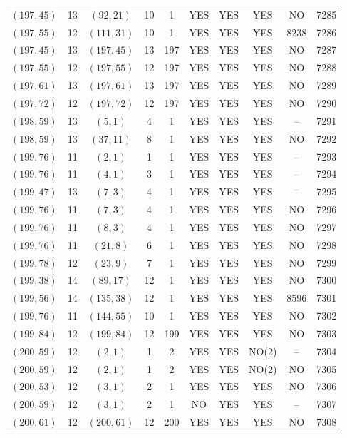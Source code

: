 \begin{longtable}{|c|c|c|c|c|c|c|c|c|c|}
$(197, 45)$ & 13 & $(92, 21)$ & 10 & 1 & YES & YES & YES & NO & 7285\\
$(197, 55)$ & 12 & $(111, 31)$ & 10 & 1 & YES & YES & YES & 8238 & 7286\\
$(197, 45)$ & 13 & $(197, 45)$ & 13 & 197 & YES & YES & YES & NO & 7287\\
$(197, 55)$ & 12 & $(197, 55)$ & 12 & 197 & YES & YES & YES & NO & 7288\\
$(197, 61)$ & 13 & $(197, 61)$ & 13 & 197 & YES & YES & YES & NO & 7289\\
$(197, 72)$ & 12 & $(197, 72)$ & 12 & 197 & YES & YES & YES & NO & 7290\\
$(198, 59)$ & 13 & $(5, 1)$ & 4 & 1 & YES & YES & YES & -- & 7291\\
$(198, 59)$ & 13 & $(37, 11)$ & 8 & 1 & YES & YES & YES & NO & 7292\\
$(199, 76)$ & 11 & $(2, 1)$ & 1 & 1 & YES & YES & YES & -- & 7293\\
$(199, 76)$ & 11 & $(4, 1)$ & 3 & 1 & YES & YES & YES & -- & 7294\\
$(199, 47)$ & 13 & $(7, 3)$ & 4 & 1 & YES & YES & YES & -- & 7295\\
$(199, 76)$ & 11 & $(7, 3)$ & 4 & 1 & YES & YES & YES & NO & 7296\\
$(199, 76)$ & 11 & $(8, 3)$ & 4 & 1 & YES & YES & YES & NO & 7297\\
$(199, 76)$ & 11 & $(21, 8)$ & 6 & 1 & YES & YES & YES & NO & 7298\\
$(199, 78)$ & 12 & $(23, 9)$ & 7 & 1 & YES & YES & YES & NO & 7299\\
$(199, 38)$ & 14 & $(89, 17)$ & 12 & 1 & YES & YES & YES & NO & 7300\\
$(199, 56)$ & 14 & $(135, 38)$ & 12 & 1 & YES & YES & YES & 8596 & 7301\\
$(199, 76)$ & 11 & $(144, 55)$ & 10 & 1 & YES & YES & YES & NO & 7302\\
$(199, 84)$ & 12 & $(199, 84)$ & 12 & 199 & YES & YES & YES & NO & 7303\\
$(200, 59)$ & 12 & $(2, 1)$ & 1 & 2 & YES & YES & NO(2) & -- & 7304\\
$(200, 59)$ & 12 & $(2, 1)$ & 1 & 2 & YES & YES & NO(2) & NO & 7305\\
$(200, 53)$ & 12 & $(3, 1)$ & 2 & 1 & YES & YES & YES & NO & 7306\\
$(200, 59)$ & 12 & $(3, 1)$ & 2 & 1 & NO & YES & YES & -- & 7307\\
$(200, 61)$ & 12 & $(200, 61)$ & 12 & 200 & YES & YES & YES & NO & 7308\\

\end{longtable}
